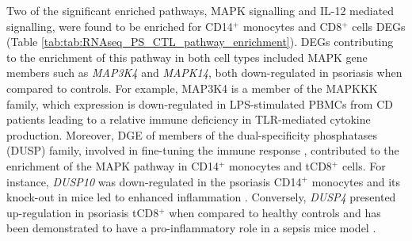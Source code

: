 Two of the significant enriched pathways, MAPK signalling and IL-12 mediated signalling, were found to be enriched for CD14$^+$ monocytes and CD8$^+$ cells DEGs (Table \ref{tab:tab:RNAseq_PS_CTL_pathway_enrichment}). DEGs contributing to the enrichment of this pathway in both cell types included MAPK gene members such as \textit{MAP3K4} and \textit{MAPK14}, both down-regulated in psoriasis when compared to controls. For example, MAP3K4 is a member of the MAPKKK family, which expression is down-regulated in LPS-stimulated PBMCs from CD patients leading to a relative immune deficiency in TLR-mediated cytokine production. Moreover, DGE of members of the dual-specificity phosphatases (DUSP) family, involved in fine-tuning the immune response \parencite{Qian2009}, contributed to the enrichment of the MAPK pathway in CD14$^+$ monocytes and tCD8$^+$ cells. For instance, \textit{DUSP10} was down-regulated in the psoriasis CD14$^+$ monocytes and its knock-out in mice led to enhanced inflammation \parencite{Qian2009}. Conversely, \textit{DUSP4} presented up-regulation in psoriasis tCD8$^+$ when compared to healthy controls and has been demonstrated to have a pro-inflammatory role in a sepsis mice model \parencite{Cornell2010}.


